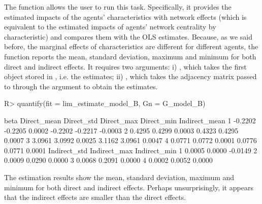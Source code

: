 \documentclass[nojss]{jss}
\begin{document}
The function  allows the user to run this task.
Specifically, it provides the estimated impacts of the agents'
characteristics with network effects (which is equivalent to the estimated impacts of agents' network centrality by characteristic) and compares them with the OLS estimates. Because, as we said before, the marginal effects of characteristics are different for different agents, the function  reports the mean, standard deviation, maximum and minimum for both direct and indirect effects. It
requires two arguments: i) , which takes the first object stored in , i.e. the estimates; ii) , which takes the adjacency matrix passed to  through the argument  to obtain the estimates.
\begin{CodeChunk}
\begin{CodeInput}
R> quantify(fit = lim_estimate_model_B, Gn = G_model_B)
\end{CodeInput}
\begin{CodeOutput}
beta Direct_mean Direct_std Direct_max Direct_min Indirect_mean
1 -0.2202     -0.2205     0.0002    -0.2202    -0.2217       -0.0003
2  0.4295      0.4299     0.0003     0.4323     0.4295        0.0007
3  3.0961      3.0992     0.0025     3.1162     3.0961        0.0047
4  0.0771      0.0772     0.0001     0.0776     0.0771        0.0001
Indirect_std Indirect_max Indirect_min
1       0.0005       0.0000      -0.0149
2       0.0009       0.0290       0.0000
3       0.0068       0.2091       0.0000
4       0.0002       0.0052       0.0000
\end{CodeOutput}
\end{CodeChunk}
The estimation results show the mean, standard deviation, maximum and minimum for both direct and indirect effects. Perhaps unsurprisingly, it appears that the indirect effects are smaller than the direct effects.
\end{document}
